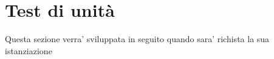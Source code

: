 \section{Test di unità}
Questa sezione verra' sviluppata in seguito quando sara' richista la sua istanziazione